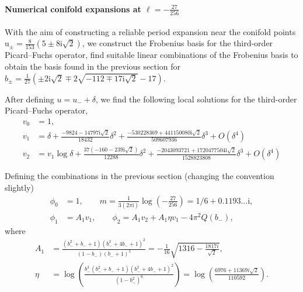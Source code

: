\documentclass[11pt, a4paper]{article}
\newcommand{\ii}{\mathrm{i}}
\newcommand{\ur}{\mathrm{u}}
\numberwithin{equation}{section}
\begin{document}
\paragraph{Numerical conifold expansions at $\ell = -\frac{27}{256}$}
With the aim of constructing a reliable period expansion near the conifold points $\ur_{\pm} = \frac{8}{153} \left(5\pm8 \ii \sqrt{2}\right)$, we construct the Frobenius basis for the third-order Picard--Fuchs operator, find suitable linear combinations of the Frobenius basis to obtain the basis found in the previous section for $b_{\pm} = \frac{1}{27} \left(\pm 2 \ii \sqrt{2} \mp 2 \sqrt{-112 \mp 17 \ii \sqrt{2}}-17\right)$.

After defining $u = u_{-} + \delta$, we find the following local solutions for the third-order Picard--Fuchs operator,
\begin{equation}
  \begin{aligned}
    v_0 &= 1, \\
    v_1 &= \delta
          + \frac{-9824 - 14797 \ii \sqrt{2}}{18432} \delta^2
          + \frac{-530228369 + 441150080 \ii \sqrt{2}}{509607936} \delta^3
          + O(\delta^4) \\
    v_2 &= v_1 \log \delta + \frac{37(-160 - 239 \ii \sqrt{2})}{12288} \delta^2
          + \frac{-2043093721 + 1720477504 \ii \sqrt{2}}{1528823808} \delta^3
          + O(\delta^4)
  \end{aligned}
\end{equation}

Defining the combinations in the previous section (changing the convention slightly)
\begin{equation}
  \begin{aligned}
    \phi_0 &= 1, \qquad m = \frac{1}{3 (2\pi \ii)}\log\left( -\frac{27}{256} \right) = 1/6 + 0.1193\dots \ii, \\
    \phi_1 &= A_1 v_1, \qquad \phi_2 = A_1 v_2 + A_1 \eta v_1 -4 \pi ^2 Q(b_{-}),
  \end{aligned}
\end{equation}
where
\begin{equation}
  \begin{aligned}
    A_1 &= \frac{\left(b_{-}^2+b_{-}+1\right) \left(b_{-}^2+4 b_{-}+1\right)^2}{(1-b_{-}) (b_{-}+1)^5} = -\frac{1}{16} \sqrt{1316-\frac{1817 i}{\sqrt{2}}}, \\
    \eta &= \log \left(\frac{b_{-}^3 \left(b_{-}^2+b_{-}+1\right) \left(b_{-}^2+4 b_{-}+1\right)^2}{\left(1-b_{-}^2\right)^6}\right) = \log \left(\frac{6976+11369 i \sqrt{2}}{110592}\right).
  \end{aligned}
\end{equation}
\end{document}
